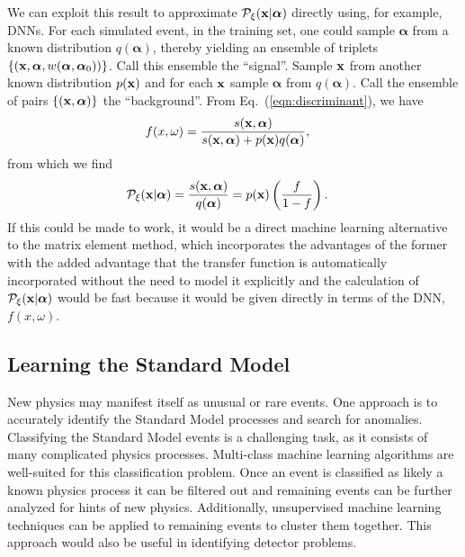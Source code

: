 We can exploit this result to approximate $\mathcal{P}_{\xi}({\bf x}|{\boldsymbol\alpha})$ directly using, for example, DNNs. For each simulated event, in the training set, one could sample $\boldsymbol{\alpha}$ from a known distribution $q(\boldsymbol{\alpha})$, thereby yielding an ensemble of triplets $\{ ({\bf x}, \boldsymbol{\alpha}, w(\boldsymbol{\alpha}, \boldsymbol{\alpha}_0)) \}$. Call this ensemble the ``signal''.
Sample ${\bf x}$ from another known distribution $p({\bf x})$ and for each ${\bf x}$ sample $\boldsymbol{\alpha}$ from $q(\boldsymbol{\alpha})$. Call the ensemble of pairs $\{({\bf x}, \boldsymbol{\alpha})\}$ the ``background''.
From Eq.~(\ref{eqn:discriminant}), we have
\begin{align}
 f(x, \omega) & = \frac{s({\bf x}, \boldsymbol{\alpha})}{s({\bf x}, \boldsymbol{\alpha}) + p({\bf x}) q(\boldsymbol{\alpha})},
\end{align}
from which we find
\begin{align}
 \mathcal{P}_{\xi}({\bf x}|{\boldsymbol\alpha}) & = \frac{s({\bf x}, {\boldsymbol\alpha})}{q(\boldsymbol{\alpha})} = p({\bf x}) \left( \frac{f}{1 - f} \right).
\end{align}
If this could be made to work, it would be a direct machine learning alternative to the matrix element method, which incorporates the advantages of the former with the added advantage that the transfer function is automatically incorporated without the need to model it explicitly and the calculation of $\mathcal{P}_{\xi}({\bf x}|{\boldsymbol\alpha})$ would be fast because it would be given directly in terms of the DNN, $f(x, \omega)$.

\subsection{Learning the Standard Model}

New physics may manifest itself as unusual or rare events. One approach is to accurately identify the Standard Model processes and search for anomalies. Classifying the Standard Model events is a challenging task, as it consists of many complicated physics processes. Multi-class machine learning algorithms are well-suited for this classification problem. Once an event is classified as likely a known physics process it can be filtered out and remaining events can be further analyzed for hints of new physics. Additionally, unsupervised machine learning techniques can be applied to remaining events to cluster them together. This approach would also be useful in identifying detector problems.




